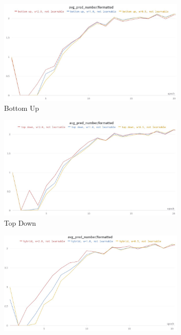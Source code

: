 \begin{figure}
     \centering
     \begin{subfigure}{0.8\textwidth}
         \centering
         \includegraphics[width=\textwidth]{figures/wandb_weights_bottom_up_avg_pred_start.JPG}
         \caption{Bottom Up}
     \end{subfigure}
     \vfill
     \begin{subfigure}{0.8\textwidth}
         \centering
         \includegraphics[width=\textwidth]{figures/wandb_weights_top_down_avg_pred_start.JPG}
         \caption{Top Down}
     \end{subfigure}
     \vfill
     \begin{subfigure}{0.8\textwidth}
         \centering
         \includegraphics[width=\textwidth]{figures/wandb_weights_hybrid_avg_pred_start.JPG}

\end{subfigure}
\end{figure}
